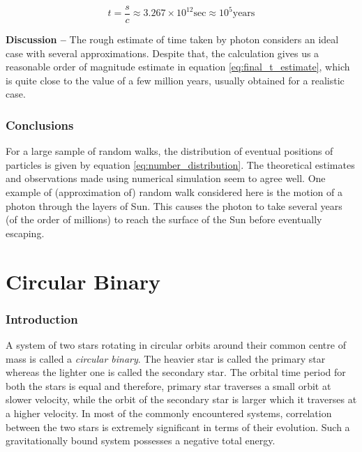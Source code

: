 \documentclass[a4paper]{article}
\begin{document}
\begin{enumerate} [label*=\textbf{(\alph*)}]
					\begin{equation}
					 	t = \frac{s}{c} \approx 3.267 \times 10^{12}_{} \text{sec} \approx 10^5 \text{years}
					 	\label{eq:final_t_estimate}
					\end{equation}
					
				\subitem \textbf{Discussion --}
					The rough estimate of time taken by photon considers an ideal case with several approximations. Despite that, the calculation gives us a reasonable order of magnitude estimate in equation \ref{eq:final_t_estimate}, which is quite close to the value of a few million years, usually obtained for a realistic case.
			
		\end{enumerate}

		
		\section{Conclusions} \label{1:conclusions}
		
		For a large sample of random walks, the distribution of eventual positions of particles is given by equation \ref{eq:number_distribution}. The theoretical estimates and observations made using numerical simulation seem to agree well. One example of (approximation of) random walk considered here is the motion of a photon through the layers of Sun. This causes the photon to take several years (of the order of millions) to reach the surface of the Sun before eventually escaping.  
		

	
	
	\clearpage
	\setcounter{section}{0}
	\part{Circular Binary} \label{Problem2}
	

		\section{Introduction} \label{2:introduction}
		A system of two stars rotating in circular orbits around their common centre of mass is called a \emph{circular binary}. The heavier star is called the primary star whereas the lighter one is called the secondary star. The orbital time period for both the stars is equal and therefore, primary star traverses a small orbit at slower velocity, while the orbit of the secondary star is larger which it traverses at a higher velocity. In most of the commonly encountered systems, correlation between the two stars is extremely significant in terms of their evolution. Such a gravitationally bound system possesses a negative total energy.
\end{document}
